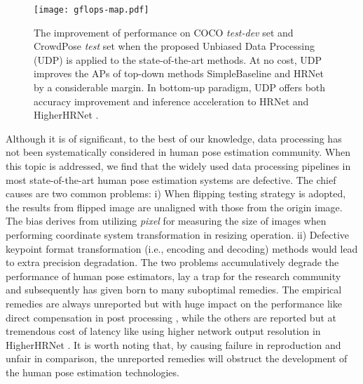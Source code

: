 \documentclass[10pt,journal,compsoc]{IEEEtran}
\begin{document}
\begin{figure}[t]
	\setlength{\abovecaptionskip}{0.cm}
    \begin{center}
        \texttt{[image: gflops-map.pdf]}
    \end{center}
   \caption{The improvement of performance on COCO \textit{test-dev} set and CrowdPose \textit{test} set when the proposed Unbiased Data Processing (UDP) is applied to the state-of-the-art methods. At no cost, UDP improves the APs of top-down methods SimpleBaseline \cite{SBNet} and HRNet \cite{HRNet} by a considerable margin. In bottom-up paradigm, UDP offers both accuracy improvement and inference acceleration to HRNet \cite{HRNet} and HigherHRNet \cite{Higher}.}
    \label{fig:mAP-gflops}
\end{figure}

Although it is of significant, to the best of our knowledge, data processing has not been systematically considered in human pose estimation community. When this topic is addressed, we find that the widely used data processing pipelines in most state-of-the-art human pose estimation systems \cite{CPN,SBNet,MSPN,HRNet,Higher,DARK} are defective. The chief causes are two common problems: i) When flipping testing strategy is adopted, the results from flipped image are unaligned with those from the origin image. The bias derives from utilizing \textit{pixel} for measuring the size of images when performing coordinate system transformation in resizing operation. ii) Defective keypoint format transformation (i.e., encoding and decoding) methods would lead to extra precision degradation. The two problems accumulatively degrade the performance of human pose estimators, lay a trap for the research community and subsequently has given born to many suboptimal remedies. The empirical remedies are always unreported but with huge impact on the performance like direct compensation in post processing \cite{CPN,SBNet,HRNet,MSPN,DARK,Higher}, while the others are reported but at tremendous cost of latency like using higher network output resolution in HigherHRNet \cite{Higher}. It is worth noting that, by causing failure in reproduction and unfair in comparison, the unreported remedies will obstruct the development of the human pose estimation technologies.
\end{document}
